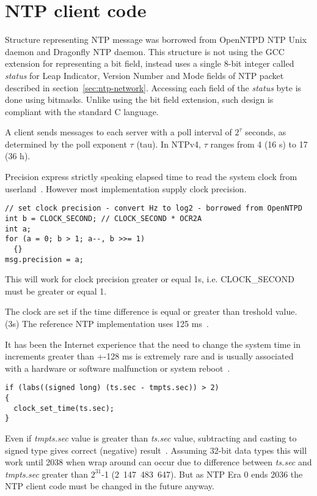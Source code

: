 
\section{NTP client code}
Structure representing NTP message was borrowed from OpenNTPD NTP Unix daemon
and Dragonfly NTP daemon.
This structure is not using the GCC extension for representing a bit field,
instead uses a single 8-bit integer called {\it{status}}
for Leap Indicator, Version Number and Mode fields of NTP packet
described in section~\ref{sec:ntp-network}.
Accessing each field of the {\it{status}} byte is done using bitmasks.
Unlike using the bit field extension,
such design is compliant with the standard C language.


A client sends messages to each server with a poll interval of $2^{\tau}$
seconds, as determined by the poll exponent $\tau$ (tau).
In NTPv4, $\tau$ ranges from 4 (16 s) to 17 (36 h).


Precision express strictly speaking elapsed time to read the system clock from userland~\cite{ntp-arch}.
However most implementation supply clock precision.
\begin{lstlisting}
// set clock precision - convert Hz to log2 - borrowed from OpenNTPD
int b = CLOCK_SECOND; // CLOCK_SECOND * OCR2A
int a;
for (a = 0; b > 1; a--, b >>= 1)
  {}
msg.precision = a;
\end{lstlisting}
This will work for clock precision greater or equal 1s, i.e. CLOCK\_SECOND must be greater or equal 1.

The clock are set if the time difference is equal or greater than
treshold value. (3s)
The reference NTP implementation uses 125 ms~\cite{rfc5905}.

It has been the Internet
experience that the need to change the system time in increments
greater than +-128 ms is extremely rare and is usually associated
with a hardware or software malfunction or system reboot~\cite{rfc1589}.
\begin{lstlisting}
if (labs((signed long) (ts.sec - tmpts.sec)) > 2)
{
  clock_set_time(ts.sec);
}
\end{lstlisting}
Even if {\it{tmpts.sec}} value is greater than {\it{ts.sec}} value,
subtracting and casting to signed type gives correct (negative) result~\cite{c99}.
Assuming 32-bit data types this will work until 2038 when wrap around can occur due to difference
between {\it{ts.sec}} and {\it{tmpts.sec}} greater than $2^{31}$-1 (2~147~483~647).
But as NTP Era 0 ends 2036 the NTP client code must be changed in the future anyway.

